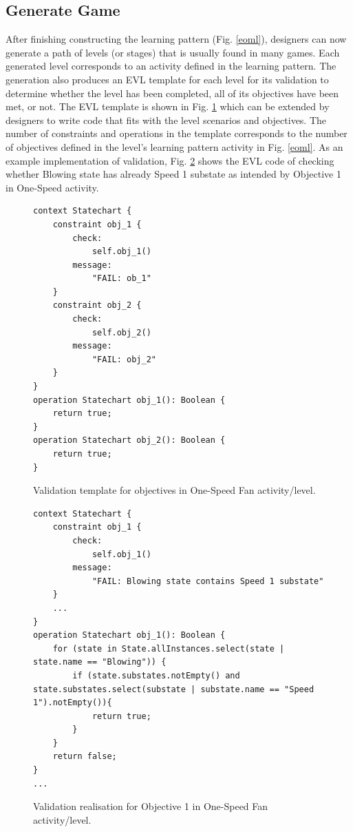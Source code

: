 \documentclass[conference]{IEEEtran}
\begin{document}
\subsection{Generate Game}
After finishing constructing the learning pattern (Fig. \ref{eoml}), designers can now generate a path of levels (or stages) that is usually found in many games. Each generated level corresponds to an activity defined in the learning pattern. The generation also produces an EVL \cite{kolovos2006eclipse} template for each level for its validation to determine whether the level has been completed, all of its objectives have been met, or not. The EVL template is shown in Fig. \ref{validation-template} which can be extended by designers to write code that fits with the level scenarios and objectives. The number of constraints and operations in the template corresponds to the number of objectives defined in the level's learning pattern activity in Fig. \ref{eoml}. As an example implementation of validation, Fig. \ref{validation-realisation} shows the EVL code of checking whether Blowing state has already Speed 1 substate as intended by Objective 1 in One-Speed activity.   

\begin{figure}[th]
\centering
\begin{lstlisting}
context Statechart {
    constraint obj_1 {
        check: 
            self.obj_1()
        message:
            "FAIL: ob_1"
    }
    constraint obj_2 {
        check: 
            self.obj_2()
        message:
            "FAIL: obj_2"
    }        
}
operation Statechart obj_1(): Boolean {
    return true;
}
operation Statechart obj_2(): Boolean {
    return true;
}
\end{lstlisting} 
\caption{Validation template for objectives in One-Speed Fan activity/level.}
\label{validation-template}
\end{figure}

\begin{figure}[th]
\centering
\begin{lstlisting}
context Statechart {
    constraint obj_1 {
        check: 
            self.obj_1()
        message:
            "FAIL: Blowing state contains Speed 1 substate"
    }
    ...
}
operation Statechart obj_1(): Boolean {
    for (state in State.allInstances.select(state | state.name == "Blowing")) {
        if (state.substates.notEmpty() and state.substates.select(substate | substate.name == "Speed 1").notEmpty()){
            return true;
        }        
    }
    return false;
}
...
\end{lstlisting} 
\caption{Validation realisation for Objective 1 in One-Speed Fan activity/level.}
\label{validation-realisation}
\end{figure}
\end{document}
